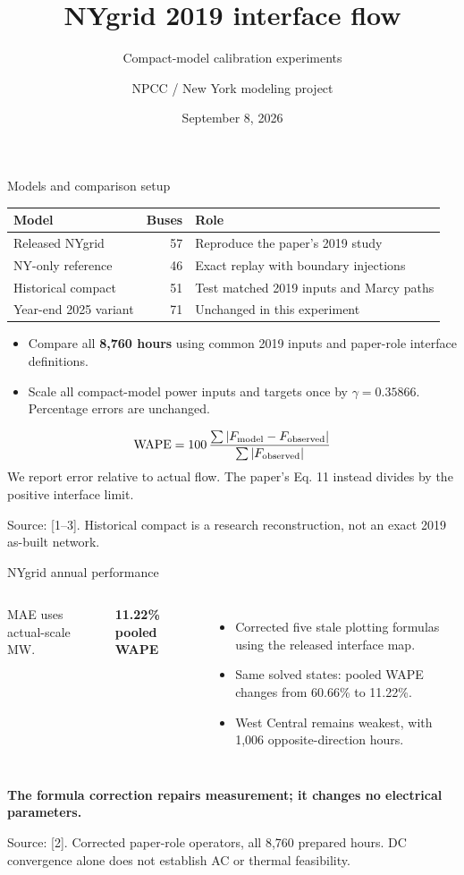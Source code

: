 \documentclass[aspectratio=169,10pt]{beamer}
\title[NYgrid 2019 interface-flow update]{NYgrid 2019 interface flow}
\subtitle{Compact-model calibration experiments}
\author{NPCC / New York modeling project}
\date{September 8, 2026}
\renewcommand{\source}[1]{\par\vfill{\color{muted}\fontsize{6.5}{7.5}\selectfont Source: #1\par}}
\newcommand{\lead}[1]{{\large\color{navy}\bfseries #1}\par\medskip}
\newcommand{\minor}[1]{{\small\color{muted}#1}\par}
\newcommand{\tightitems}{\setlength{\itemsep}{1em}}
\begin{document}

\begin{frame}{Models and comparison setup}
\begin{center}
\begin{tabular}{lrl}
\toprule
Model & Buses & Role \\
\midrule
Released NYgrid & 57 & Reproduce the paper's 2019 study \\
NY-only reference & 46 & Exact replay with boundary injections \\
Historical compact & 51 & Test matched 2019 inputs and Marcy paths \\
Year-end 2025 variant & 71 & Unchanged in this experiment \\
\bottomrule
\end{tabular}
\end{center}
\medskip
\begin{itemize}\tightitems
\item Compare all \textbf{8,760 hours} using common 2019 inputs and paper-role interface definitions.
\item Scale all compact-model power inputs and targets once by $\gamma=0.35866$. Percentage errors are unchanged.
\end{itemize}
\medskip
\[
\mathrm{WAPE}=100\,\frac{\sum |F_{\rm model}-F_{\rm observed}|}{\sum |F_{\rm observed}|}
\]
\minor{We report error relative to actual flow. The paper's Eq. 11 instead divides by the positive interface limit.}
\source{[1--3]. Historical compact is a research reconstruction, not an exact 2019 as-built network.}
\end{frame}

\begin{frame}{NYgrid annual performance}
\begin{columns}[T,onlytextwidth]
\small
\par\medskip
\minor{MAE uses actual-scale MW.}
\lead{11.22\% pooled WAPE}
\begin{itemize}\tightitems
\item Corrected five stale plotting formulas using the released interface map.
\item Same solved states: pooled WAPE changes from 60.66\% to 11.22\%.
\item West Central remains weakest, with 1,006 opposite-direction hours.
\end{itemize}
\end{columns}
\par\bigskip
\textbf{The formula correction repairs measurement; it changes no electrical parameters.}
\source{[2]. Corrected paper-role operators, all 8,760 prepared hours. DC convergence alone does not establish AC or thermal feasibility.}
\end{frame}
\end{document}
